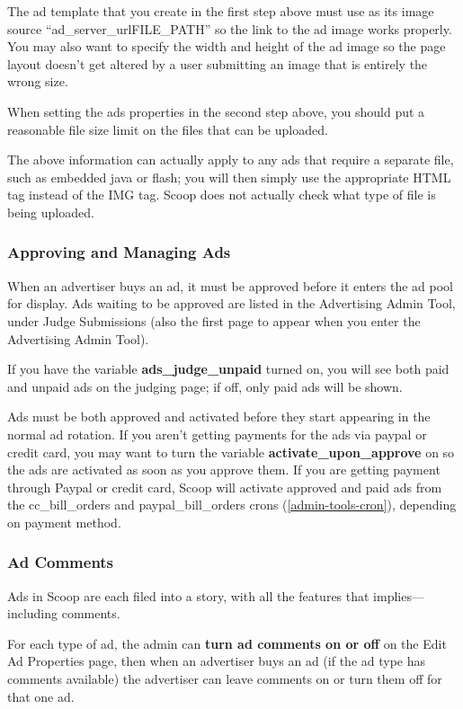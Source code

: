 The ad template that you create in the first step above must use as its image source ``\latexhtml{$\vert$}{|}ad\_server\_url\latexhtml{$\vert$$\vert$}{||}FILE\_PATH\latexhtml{$\vert$}{|}'' so the link to the ad image works properly. You may also want to specify the width and height of the ad image so the page layout doesn't get altered by a user submitting an image that is entirely the wrong size. 

When setting the ads properties in the second step above, you should put a reasonable file size limit on the files that can be uploaded.

The above information can actually apply to any ads that require a separate file, such as embedded java or flash; you will then simply use the appropriate HTML tag instead of the IMG tag. Scoop does not actually check what type of file is being uploaded.

\subsubsection{Approving and Managing Ads}

When an advertiser buys an ad, it must be approved before it enters the ad pool for display.  Ads waiting to be approved are listed in the Advertising Admin Tool, under Judge Submissions (also the first page to appear when you enter the Advertising Admin Tool).

If you have the variable {\bf ads\_judge\_unpaid} turned on, you will see both paid and unpaid ads on the judging page; if off, only paid ads will be shown.

Ads must be both approved and activated before they start appearing in the normal ad rotation.  If you aren't getting payments for the ads via paypal or credit card, you may want to turn the variable {\bf activate\_upon\_approve} on so the ads are activated as soon as you approve them.  If you are getting payment through Paypal or credit card, Scoop will activate approved and paid ads from the cc\_bill\_orders and paypal\_bill\_orders crons (\ref{admin-tools-cron}), depending on payment method.

\subsubsection{Ad Comments}

Ads in Scoop are each filed into a story, with all the features that implies---including comments.

For each type of ad, the admin can {\bf turn ad comments on or off} on the Edit Ad Properties page, then when an advertiser buys an ad (if the ad type has comments available) the advertiser can leave comments on or turn them off for that one ad.

